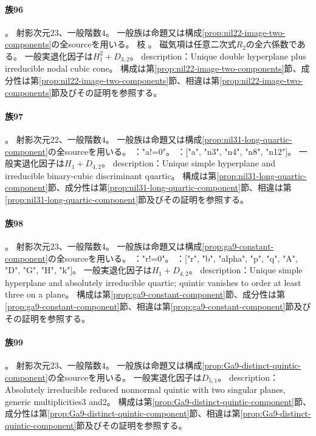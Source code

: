 \paragraph{族96}\label{catalogue:R4_NIL22_IMAGE_NODAL_CUBIC_NODE_TANGENT_23}
。
射影次元$23$、一般階数$4$。
一般族は命題又は構成\ref{prop:nil22-image-two-components}の全sourceを用いる。
枝 。
磁気項は任意二次式$R_2$の全六係数である。
一般実退化因子は$H_{1}^{2}+D_{3,2}$。
description：Unique double hyperplane plus irreducible nodal cubic cone。
構成は第\ref{prop:nil22-image-two-components}節、成分性は第\ref{prop:nil22-image-two-components}節、相違は第\ref{prop:nil22-image-two-components}節及びその証明を参照する。

\paragraph{族97}\label{catalogue:R4_NIL31_LONG_HYPERPLANE_QUARTIC_22}
。
射影次元$22$、一般階数$4$。
一般族は命題又は構成\ref{prop:nil31-long-quartic-component}の全sourceを用いる。
："a!=0"。
：["a", "n3", "n4", "n8", "n12"]。
一般実退化因子は$H_{1}+D_{4,2}$。
description：Unique simple hyperplane and irreducible binary-cubic discriminant quartic。
構成は第\ref{prop:nil31-long-quartic-component}節、成分性は第\ref{prop:nil31-long-quartic-component}節、相違は第\ref{prop:nil31-long-quartic-component}節及びその証明を参照する。

\paragraph{族98}\label{catalogue:R4_GA9_CONSTANT_HYPERPLANE_QUARTIC_23}
。
射影次元$23$、一般階数$4$。
一般族は命題又は構成\ref{prop:ga9-constant-component}の全sourceを用いる。
："r!=0"。
：["r", "b", "alpha", "p", "q", "A", "D", "G", "H", "k"]。
一般実退化因子は$H_{1}+D_{4,2}$。
description：Unique simple hyperplane and absolutely irreducible quartic; quintic vanishes to order at least three on a plane。
構成は第\ref{prop:ga9-constant-component}節、成分性は第\ref{prop:ga9-constant-component}節、相違は第\ref{prop:ga9-constant-component}節及びその証明を参照する。

\paragraph{族99}\label{catalogue:R4_GA9_DISTINCT_IRREDUCIBLE_QUINTIC_23}
。
射影次元$23$、一般階数$4$。
一般族は命題又は構成\ref{prop:Ga9-distinct-quintic-component}の全sourceを用いる。
一般実退化因子は$D_{5,1}$。
description：Absolutely irreducible reduced nonnormal quintic with two singular planes, generic multiplicities3 and2。
構成は第\ref{prop:Ga9-distinct-quintic-component}節、成分性は第\ref{prop:Ga9-distinct-quintic-component}節、相違は第\ref{prop:Ga9-distinct-quintic-component}節及びその証明を参照する。


